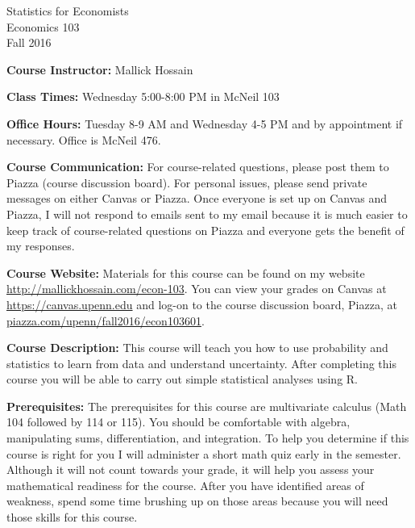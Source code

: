\documentclass[11pt, letterpaper]{article}
\begin{document}
\thispagestyle{plain}

\begin{center}
\Large
\sc
Statistics for Economists\\
\large
Economics 103\\
\large
Fall 2016
\end{center}


\normalsize
\bigskip
\noindent \textbf{Course Instructor:} Mallick Hossain

\medskip

\noindent \textbf{Class Times:} Wednesday 5:00-8:00 PM in McNeil 103

\medskip

\noindent \textbf{Office Hours:} Tuesday 8-9 AM and Wednesday 4-5 PM and by appointment if necessary. Office is McNeil 476.

\medskip

\noindent \textbf{Course Communication:} 
For course-related questions, please post them to Piazza (course discussion board). 
For personal issues, please send private messages on either Canvas or Piazza. 
Once everyone is set up on Canvas and Piazza, I will not respond to emails sent to my email because it is much easier to keep track of course-related questions on Piazza and everyone gets the benefit of my responses. 

\medskip
 
\noindent \textbf{Course Website:} Materials for this course can be found on my website \url{http://mallickhossain.com/econ-103}. 
You can view your grades on Canvas at \url{https://canvas.upenn.edu} and log-on to the course discussion board, Piazza, at \url{piazza.com/upenn/fall2016/econ103601}.

\medskip

\noindent \textbf{Course Description:} 
This course will teach you how to use probability and statistics to learn from data and understand uncertainty. 
After completing this course you will be able to carry out simple statistical analyses using R.

\medskip

\noindent \textbf{Prerequisites:} 
The prerequisites for this course are multivariate calculus (Math 104 followed by 114 or 115). 
You should be comfortable with algebra, manipulating sums, differentiation, and integration. 
To help you determine if this course is right for you I will administer a short math quiz early in the semester. 
Although it will not count towards your grade, it will help you assess your mathematical readiness for the course. 
After you have identified areas of weakness, spend some time brushing up on those areas because you will need those skills for this course.
\end{document}
